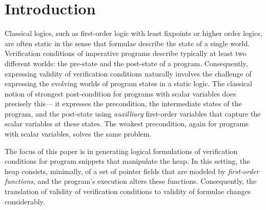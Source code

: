 \section{Introduction}
\label{sec:intro}






Classical logics, such as first-order logic with least fixpoints or higher order logics, are often static in the sense that formulae 
describe the state of a single world. 
Verification conditions of imperative programs describe typically at least two different worlds: the pre-state
and the post-state of a program. Consequently, expressing validity of verification conditions
naturally involves the challenge of expressing the evolving worlds of program states in a static logic.
The classical notion of strongest post-condition for programs with scalar variables does precisely this--- 
it expresses the precondition, the intermediate states of the program, and the post-state using \emph{auxilliary} 
first-order variables that capture the scalar variables at these states. The weakest precondition, again for
programs with scalar variables, solves the same problem.

The focus of this paper is in generating logical formulations of verification conditions for program snippets that manipulate the heap.
In this setting, the heap consists, minimally, of a set of pointer fields that are modeled by \emph{first-order
functions}, and the program's execution alters these functions.
Consequently, the translation of validity of verification conditions to validity of formulae changes considerably.

